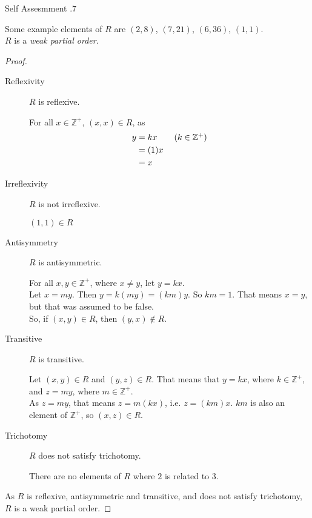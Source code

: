 \documentclass[../notes.tex]{subfiles}
\begin{document}
\begin{exercise}{Self Assesmment \thechapter.7}
\begin{enumerate}
							Some example elements of $R$ are $(2, 8)$, $(7, 21)$, $(6, 36)$, $(1, 1)$.\\
							$R$ is a \emph{weak partial order}.
							\begin{proof}
								$ $
								\begin{description}
									\item[Reflexivity] $R$ is reflexive.
										\begin{subproof}
											For all $x \in \mathbb{Z}^{+}$, $(x, x) \in R$, as
											\begin{align*}
												y &= kx \tag*{$(k \in \mathbb{Z}^{+})$}\\
												&= (1)x\\
												&= x \qedhere
											\end{align*}
										\end{subproof}
									\item[Irreflexivity] $R$ is not irreflexive.
										\begin{subproof}[Counterexample]
											$(1, 1) \in R$
										\end{subproof}
									\item[Antisymmetry] $R$ is antisymmetric.
										\begin{subproof}
											For all $x, y \in \mathbb{Z}^{+}$, where $x \neq y$, let $y = kx$.\\
											Let $x = my$. Then $y = k(my) = (km)y$. So $km = 1$. That means $x = y$, but that was assumed to be false.\\
											So, if $(x, y) \in R$, then $(y, x) \notin R$.
										\end{subproof}
									\item[Transitive] $R$ is transitive.
										\begin{subproof}
											Let $(x, y) \in R$ and $(y, z) \in R$. That means that $y = kx$, where $k \in \mathbb{Z}^{+}$, and $z = my$, where $m \in \mathbb{Z}^{+}$.\\
											As $z = my$, that means $z = m(kx)$, i.e. $z = (km)x$. $km$ is also an element of $\mathbb{Z}^{+}$, so $(x, z) \in R$.
										\end{subproof}
									\item[Trichotomy] $R$ does not satisfy trichotomy.
										\begin{subproof}[Counterexample]
											There are no elements of $R$ where $2$ is related to $3$.
										\end{subproof}
								\end{description}
								As $R$ is reflexive, antisymmetric and transitive, and does not satisfy trichotomy, $R$ is a weak partial order.
							\end{proof}
					\end{enumerate}
				\end{exercise}
		\pagebreak
\end{document}
